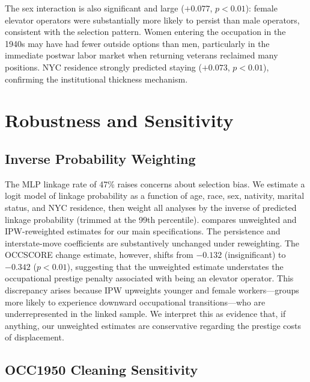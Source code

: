 \documentclass[12pt]{article}
\begin{document}
The sex interaction is also significant and large ($+0.077$, $p < 0.01$): female elevator operators were substantially more likely to persist than male operators, consistent with the selection pattern. Women entering the occupation in the 1940s may have had fewer outside options than men, particularly in the immediate postwar labor market when returning veterans reclaimed many positions. NYC residence strongly predicted staying ($+0.073$, $p < 0.01$), confirming the institutional thickness mechanism.



\section{Robustness and Sensitivity} \label{sec:robustness}

\subsection{Inverse Probability Weighting}

The MLP linkage rate of 47\% raises concerns about selection bias. We estimate a logit model of linkage probability as a function of age, race, sex, nativity, marital status, and NYC residence, then weight all analyses by the inverse of predicted linkage probability (trimmed at the 99th percentile).  compares unweighted and IPW-reweighted estimates for our main specifications. The persistence and interstate-move coefficients are substantively unchanged under reweighting. The OCCSCORE change estimate, however, shifts from $-0.132$ (insignificant) to $-0.342$ ($p < 0.01$), suggesting that the unweighted estimate understates the occupational prestige penalty associated with being an elevator operator. This discrepancy arises because IPW upweights younger and female workers---groups more likely to experience downward occupational transitions---who are underrepresented in the linked sample. We interpret this as evidence that, if anything, our unweighted estimates are conservative regarding the prestige costs of displacement.


\label{tab:ipw}

\subsection{OCC1950 Cleaning Sensitivity}
\end{document}
